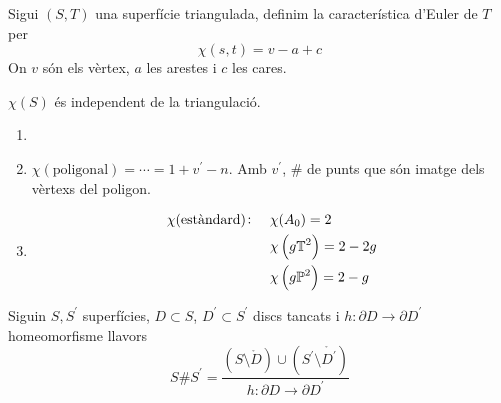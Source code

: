 \begin{defi}
	Sigui $(S, T)$ una superfície triangulada, definim la característica d'Euler de $T$ per
	\[
		\chi (s, t) = v - a + c
	\]
	On $v$ són els vèrtex, $a$ les arestes i $c$ les cares.
\end{defi}

\begin{teo*}
	$\chi(S)$ és independent de la triangulació.
\end{teo*}

\begin{example}
	\begin{enumerate}
		\item[]
		\item $\chi(\text{poligonal}) = \cdots = 1 + v^\prime - n$. Amb $v^\prime$, \# de punts que són
			imatge dels vèrtexs del poligon.
		\item
			\[
				\begin{aligned}
					\chi (\text{estàndard}) \colon \quad & \chi(A_0) = 2 \\ & \chi \left( g \mathbb{T}^2 \right) = 2 -2g \\
					& \chi \left( g\mathbb{P}^2 \right) = 2 - g 
				\end{aligned}
			\]
	\end{enumerate}
\end{example}

\begin{defi}
	Siguin $S, S^\prime$ superfícies, $D \subset S$, $D^\prime \subset S^\prime$ discs tancats i
	$h \colon \partial D \to \partial D^\prime$ homeomorfisme llavors
	\[
		S \# S^\prime = \frac{\left(S \setminus \mathring{D} \right) \cup 
		\left( S^\prime \setminus \mathring{D^\prime} \right)}{h \colon \partial D \to \partial D^\prime}
	\]
\end{defi}
